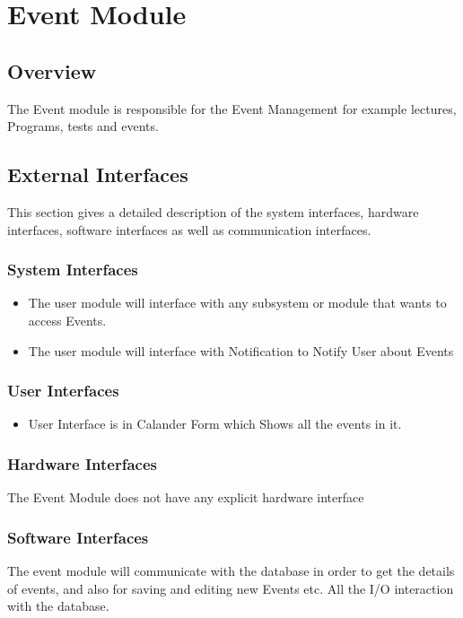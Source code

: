 \section{Event Module}
\subsection{Overview}
The Event module is responsible for the Event Management for example lectures, Programs, tests and events.
 
\subsection{External Interfaces}
This section gives a detailed description of the system interfaces, hardware interfaces, software interfaces as well as communication interfaces. 

	\subsubsection{System Interfaces}
		\begin{itemize}
			\item The user module will interface with any subsystem or module that wants to access Events.

			\item  The user module will interface with Notification to Notify User about Events
		
		\end{itemize}
	\subsubsection{User Interfaces }
	\begin{itemize} 

	\item User Interface is in Calander Form which Shows all the events in it.

 \end{itemize}
 
	\subsubsection{Hardware Interfaces }
	The Event Module does not have any explicit hardware interface

	\subsubsection{Software Interfaces } 
	The event module will communicate with the database in order to get the details of events, and also for saving and editing new Events etc. All the I/O interaction with the database.
	
